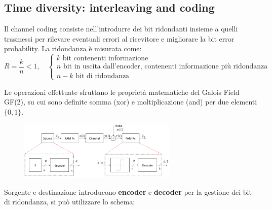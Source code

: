 \subsection*{Time diversity: interleaving and coding}
Il channel coding consiste nell'introdurre dei bit ridondanti insieme a quelli trasmessi per rilevare eventuali errori al ricevitore e migliorare la bit error probability.
La ridondanza è misurata come:
\[
    R = \frac{k}{n} < 1, \quad \begin{cases}
        k \text{ bit contenenti informazione} \\
        n \text{ bit in uscita dall'encoder, contenenti informazione più ridondanza} \\
        n - k \text{ bit di ridondanza}
    \end{cases}
\]

Le operazioni effettuate sfruttano le proprietà matematiche del Galois Field GF(2), su cui sono definite somma (xor) e moltiplicazione (and) per due elementi $\{0, 1\}$.

\begin{figure}[ht]
    \centering
    \includegraphics[width=0.675\textwidth]{imgs/encoder_decoder.jpg}
\end{figure}

Sorgente e destinazione introducono \textbf{encoder} e \textbf{decoder} per la gestione dei bit di ridondanza, si può utilizzare lo schema:


\begin{center}
\end{center}


